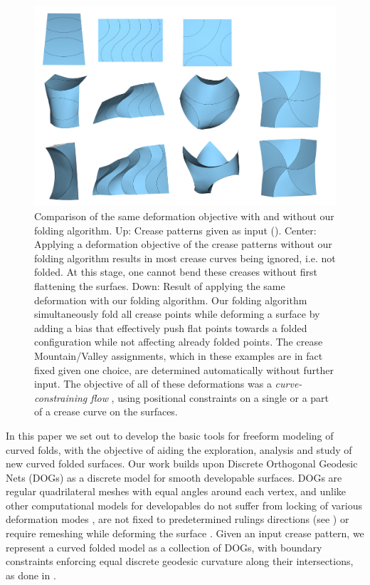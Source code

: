 \begin{figure} [h]
	\centering
	\includegraphics[width=\linewidth]{figures/fold_bias_compare}
	\caption{Comparison of the same deformation objective with and without our folding algorithm. Up: Crease patterns given as input (). Center: Applying a deformation objective of the crease patterns without our folding algorithm results in most crease curves being ignored, i.e. not folded. At this stage, one cannot bend these creases without first flattening the surfaes. Down: Result of applying the same deformation with our folding algorithm. Our folding algorithm simultaneously fold all crease points while deforming a surface by adding a bias that effectively push flat points towards a folded configuration while not affecting already folded points. The crease Mountain/Valley assignments, which in these examples are in fact fixed given one choice, are determined automatically without further input. The objective of all of these deformations was a  \textit{curve-constraining flow} \cite{rabi2018shape}, using positional constraints on a single or a part of a crease curve on the surfaces.}
	\label{fig:folded_and_not_folded}
\end{figure}

In this paper we set out to develop the basic tools for freeform modeling of curved folds, with the objective of aiding the exploration, analysis and study of new curved folded surfaces. Our work builds upon Discrete Orthogonal Geodesic Nets (DOGs) \cite{rabi18,rabi2018shape} as a discrete model for smooth developable surfaces. DOGs are regular quadrilateral meshes with equal angles around each vertex, and unlike other computational models for developables do not suffer from locking of various deformation modes \cite{locking1,locking2,grin_shells}, are not fixed to predetermined rulings directions \cite{pottmann_new,curved_folding_kilian} (see ) or require remeshing while deforming the surface \cite{StringActuated:2017,SchreckEG2017,Narain}. Given an input crease pattern, we represent a curved folded model as a collection of DOGs, with boundary constraints enforcing equal discrete geodesic curvature along their intersections, as done in \cite{rabi2018shape}.

